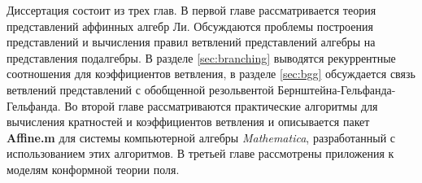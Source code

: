 \intro

%
%

\actualitysection
\actualitytext

\objectivesection
\objectivetext

\noveltysection
\noveltytext

{}

\resultssection
\resultstext

\approbationsection
\approbationtext

\pubsection
\pubtext

\contribsection
\contribtext

\structsection
\structtext
Диссертация состоит из трех глав. В первой главе рассматривается теория представлений аффинных алгебр Ли. Обсуждаются проблемы построения представлений и вычисления правил ветвлений представлений алгебры на представления подалгебры. В разделе \ref{sec:branching}  выводятся рекуррентные соотношения для коэффициентов ветвления, в разделе \ref{sec:bgg} обсуждается связь ветвлений представлений с обобщенной резольвентой Бернштейна-Гельфанда-Гельфанда. Во второй главе рассматриваются практические алгоритмы для вычисления кратностей и коэффициентов ветвления и описывается пакет {\bf Affine.m} для системы компьютерной алгебры {\it Mathematica}, разработанный с использованием этих алгоритмов. В третьей главе рассмотрены приложения к моделям конформной теории поля. 
